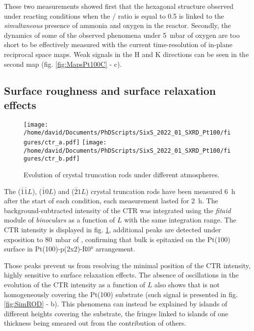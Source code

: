 These two measurements showed first that the hexagonal structure observed under reacting conditions when the / ratio is equal to \num{0.5} is linked to the \textit{simultaneous} presence of ammonia and oxygen in the reactor.
Secondly, the dynamics of some of the observed phenomena under \qty{5}{\milli\bar} of oxygen are too short to be effectively measured with the current time-resolution of in-plane reciprocal space maps.
Weak signals in the H and K directions can be seen in the second map (fig. \ref{fig:MapsPt100C} - c).

\subsection{Surface roughness and surface relaxation effects}

\begin{figure}[!htb]
    \centering
    \texttt{[image: /home/david/Documents/PhDScripts/SixS\_2022\_01\_SXRD\_Pt100/figures/ctr\_a.pdf]}
    \texttt{[image: /home/david/Documents/PhDScripts/SixS\_2022\_01\_SXRD\_Pt100/figures/ctr\_b.pdf]}
    \caption{
        Evolution of crystal truncation rods under different atmospheres.
    }
    \label{fig:CTRPt100}
\end{figure}

The ($\bar{1}\bar{1}L$), ($\bar{1}0L$) and ($\bar{2}1L$) crystal truncation rods have been measured \qty{6}{\hour} after the start of each condition, each measurement lasted for \qty{2}{\hour}.
The background-subtracted intensity of the CTR was integrated using the \textit{fitaid} module of \textit{binoculars} as a function of $L$ with the same integration range.
The CTR intensity is displayed in fig. \ref{fig:CTRPt100}, additional peaks are detected under exposition to \qty{80}{\milli\bar} of , confirming that bulk  is epitaxied on the Pt(100) surface in Pt(100)-p(2x2)-R\ang{0} arrangement.

Those peaks prevent us from resolving the minimal position of the CTR intensity, highly sensitive to surface relaxation effects.
The absence of oscillations in the evolution of the CTR intensity as a function of $L$ also shows that  is not homogeneously covering the Pt(100) substrate (such signal is presented in fig. \ref{fig:SimROD} - b).
This phenomena can instead be explained by  islands of different heights covering the substrate, the fringes linked to islands of one thickness being smeared out from the contribution of others.

